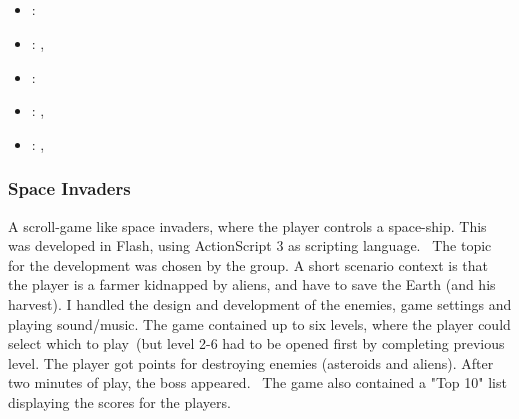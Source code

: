 \subsection[Flash Programming]{}
\label{sec:flash_prog}
\begin{itemize} 
\item {}: 
\item {}: , 
\item {}: 
\item {}: , 
\item {}: , 
\end{itemize} 

\subsubsection{Space Invaders}
\label{sec:space_invaders}
A scroll-game like space invaders, where the player controls a space-ship. 
This was developed in Flash, using ActionScript 3 as scripting language. 
The topic for the development was chosen by the group. 
A short scenario context is that the player is a farmer kidnapped by aliens, and have to save the Earth (and his harvest).
\vspace{0.5em}\newline
I handled the design and development of the enemies, game settings and playing sound/music. 
The game contained up to six levels, where the player could select which to play (but level 2-6 had to be opened first by completing previous level. 
The player got points for destroying enemies (asteroids and aliens). 
After two minutes of play, the boss appeared. 
The game also contained a "Top 10" list displaying the scores for the players.

